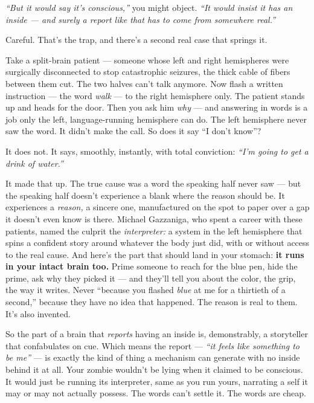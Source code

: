 \documentclass[11pt,openany]{book}
\begin{document}
\textit{“But it would say it’s conscious,”} you might object. \textit{“It would insist it has an inside — and surely a report like that has to come from somewhere real.”}

Careful. That’s the trap, and there’s a second real case that springs it.

Take a split-brain patient — someone whose left and right hemispheres were surgically disconnected to stop catastrophic seizures, the thick cable of fibers between them cut. The two halves can’t talk anymore. Now flash a written instruction — the word \textit{walk} — to the right hemisphere only. The patient stands up and heads for the door. Then you ask him \textit{why} — and answering in words is a job only the left, language-running hemisphere can do. The left hemisphere never saw the word. It didn’t make the call. So does it say “I don’t know”?

It does not. It says, smoothly, instantly, with total conviction: \textit{“I’m going to get a drink of water.”}

It made that up. The true cause was a word the speaking half never saw — but the speaking half doesn’t experience a blank where the reason should be. It experiences a \textit{reason,} a sincere one, manufactured on the spot to paper over a gap it doesn’t even know is there. Michael Gazzaniga, who spent a career with these patients, named the culprit the \textit{interpreter:} a system in the left hemisphere that spins a confident story around whatever the body just did, with or without access to the real cause. And here’s the part that should land in your stomach: \textbf{it runs in your intact brain too.} Prime someone to reach for the blue pen, hide the prime, ask why they picked it — and they’ll tell you about the color, the grip, the way it writes. Never “because you flashed \textit{blue} at me for a thirtieth of a second,” because they have no idea that happened. The reason is real to them. It’s also invented.

So the part of a brain that \textit{reports} having an inside is, demonstrably, a storyteller that confabulates on cue. Which means the report — \textit{“it feels like something to be me”} — is exactly the kind of thing a mechanism can generate with no inside behind it at all. Your zombie wouldn’t be lying when it claimed to be conscious. It would just be running its interpreter, same as you run yours, narrating a self it may or may not actually possess. The words can’t settle it. The words are cheap.
\end{document}
